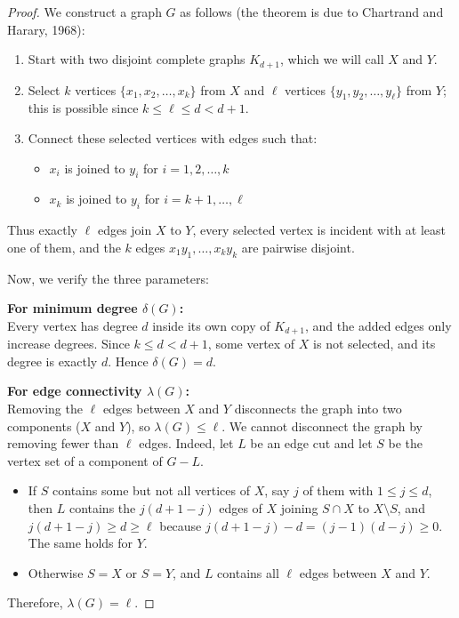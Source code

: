 \documentclass{article}
\theoremstyle{definition}
\begin{document}
\begin{proof}
We construct a graph $G$ as follows (the theorem is due to Chartrand and Harary, 1968):

\begin{enumerate}
\item Start with two disjoint complete graphs $K_{d+1}$, which we will call $X$ and $Y$.

\item Select $k$ vertices $\{x_1, x_2, \ldots, x_k\}$ from $X$ and $\ell$ vertices $\{y_1, y_2, \ldots, y_\ell\}$ from $Y$; this is possible since $k \leq \ell \leq d < d+1$.

\item Connect these selected vertices with edges such that:
  \begin{itemize}
    \item $x_i$ is joined to $y_i$ for $i = 1, 2, \ldots, k$
    \item $x_k$ is joined to $y_i$ for $i = k+1, \ldots, \ell$
  \end{itemize}
\end{enumerate}

Thus exactly $\ell$ edges join $X$ to $Y$, every selected vertex is incident with at least one of them, and the $k$ edges $x_1y_1, \ldots, x_ky_k$ are pairwise disjoint.

Now, we verify the three parameters:

\textbf{For minimum degree $\delta(G)$:}\\
Every vertex has degree $d$ inside its own copy of $K_{d+1}$, and the added edges only increase degrees. Since $k \leq d < d+1$, some vertex of $X$ is not selected, and its degree is exactly $d$. Hence $\delta(G) = d$.

\textbf{For edge connectivity $\lambda(G)$:}\\
Removing the $\ell$ edges between $X$ and $Y$ disconnects the graph into two components ($X$ and $Y$), so $\lambda(G) \leq \ell$.
We cannot disconnect the graph by removing fewer than $\ell$ edges. Indeed, let $L$ be an edge cut and let $S$ be the vertex set of a component of $G - L$.
\begin{itemize}
  \item If $S$ contains some but not all vertices of $X$, say $j$ of them with $1 \leq j \leq d$, then $L$ contains the $j(d+1-j)$ edges of $X$ joining $S \cap X$ to $X \setminus S$, and $j(d+1-j) \geq d \geq \ell$ because $j(d+1-j) - d = (j-1)(d-j) \geq 0$. The same holds for $Y$.
  \item Otherwise $S = X$ or $S = Y$, and $L$ contains all $\ell$ edges between $X$ and $Y$.
\end{itemize}
Therefore, $\lambda(G) = \ell$.


\end{proof}
\end{document}
